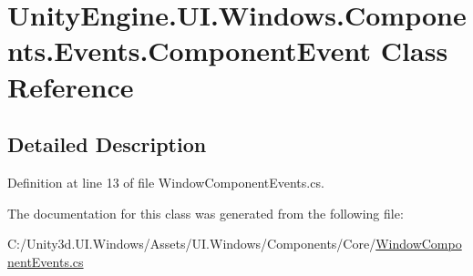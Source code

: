 \hypertarget{class_unity_engine_1_1_u_i_1_1_windows_1_1_components_1_1_events_1_1_component_event}{}\section{Unity\+Engine.\+U\+I.\+Windows.\+Components.\+Events.\+Component\+Event Class Reference}
\label{class_unity_engine_1_1_u_i_1_1_windows_1_1_components_1_1_events_1_1_component_event}


\subsection{Detailed Description}


Definition at line 13 of file Window\+Component\+Events.\+cs.



The documentation for this class was generated from the following file\+:\begin{DoxyCompactItemize}
\item 
C\+:/\+Unity3d.\+U\+I.\+Windows/\+Assets/\+U\+I.\+Windows/\+Components/\+Core/\hyperlink{_window_component_events_8cs}{Window\+Component\+Events.\+cs}\end{DoxyCompactItemize}
